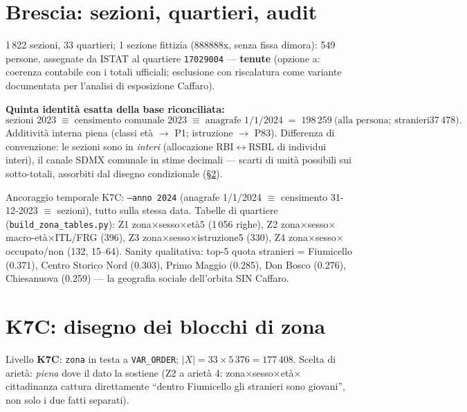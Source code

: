 \documentclass[11pt,a4paper]{article}
\newcommand{\code}[1]{\texttt{#1}}
\begin{document}
\section{Brescia: sezioni, quartieri, audit}
\label{sec:submun}
1\,822 sezioni, 33 quartieri; 1 sezione fittizia (888888x, senza fissa
dimora): 549 persone, assegnate da ISTAT al quartiere \code{17029004} ---
\textbf{tenute} (opzione a: coerenza contabile con i totali ufficiali;
esclusione con riscalatura come variante documentata per l'analisi di
esposizione Caffaro).

\medskip\noindent\textbf{Quinta identit\`a esatta della base riconciliata:}
\[
\text{sezioni 2023} \;\equiv\; \text{censimento comunale 2023} \;\equiv\;
\text{anagrafe 1/1/2024} \;=\; 198\,259 \ \text{(alla persona; stranieri
} 37\,478\text{)}.
\]
Additivit\`a interna piena (classi et\`a $\to$ P1; istruzione $\to$ P83).
Differenza di convenzione: le sezioni sono in \emph{interi} (allocazione
RBI$\leftrightarrow$RSBL di individui interi), il canale SDMX comunale in
stime decimali --- scarti di unit\`a possibili sui sotto-totali, assorbiti dal
disegno condizionale (\S\ref{sec:k7c}).

\medskip\noindent Ancoraggio temporale K7C: \code{--anno 2024}
(anagrafe 1/1/2024 $\equiv$ censimento 31-12-2023 $\equiv$ sezioni), tutto
sulla stessa data. Tabelle di quartiere (\code{build\_zona\_tables.py}):
Z1 zona$\times$sesso$\times$et\`a5 (1\,056 righe), Z2
zona$\times$sesso$\times$macro-et\`a$\times$ITL/FRG (396), Z3
zona$\times$sesso$\times$istruzione5 (330), Z4
zona$\times$sesso$\times$occupato/non (132, 15--64). Sanity qualitativa:
top-5 quota stranieri = Fiumicello (0.371), Centro Storico Nord (0.303),
Primo Maggio (0.285), Don Bosco (0.276), Chiesanuova (0.259) --- la geografia
sociale dell'orbita SIN Caffaro.

\section{K7C: disegno dei blocchi di zona}
\label{sec:k7c}
Livello \textbf{K7C}: \code{zona} in testa a \code{VAR\_ORDER};
$|X| = 33\times5\,376 = 177\,408$. Scelta di ariet\`a: \emph{piena} dove il
dato la sostiene (Z2 a ariet\`a 4: zona$\times$sesso$\times$et\`a$\times$
cittadinanza cattura direttamente ``dentro Fiumicello gli stranieri sono
giovani'', non solo i due fatti separati).
\end{document}
